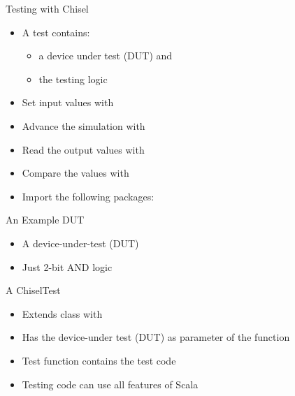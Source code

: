 
\begin{frame}[fragile]{Testing with Chisel}
\begin{itemize}
\item A test contains:
\begin{itemize}
\item a device under test (DUT) and
\item the testing logic
\end{itemize}
\item Set input values with 
\item Advance the simulation with 
\item Read the output values with 
\item Compare the values with 
\item Import the following packages:
\end{itemize}
\end{frame}

\begin{frame}[fragile]{An Example DUT}
\begin{itemize}
\item A device-under-test (DUT)
\item Just 2-bit AND logic
\end{itemize}
\end{frame}

\begin{frame}[fragile]{A ChiselTest}
\begin{itemize}
\item Extends class  with 
\item Has the device-under test (DUT) as parameter of the  function
\item Test function contains the test code
\item Testing code can use all features of Scala
\end{itemize}
\end{frame}



